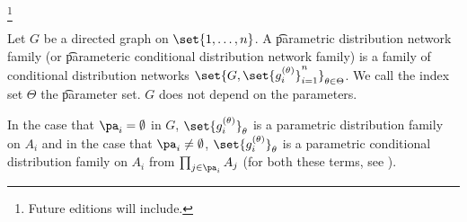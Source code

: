 
\footnote{Future editions will include.}


Let $G$ be a directed graph on $\set{1,\dots, n}$.
A \t{parametric distribution network family} (or \t{parameteric conditional distribution network family}) is a family of conditional distribution networks $\set{G, \set{g_i^{(\theta)}}_{i=1}^{n}}_{\theta \in \Theta}$.
We call the index set $\Theta$ the \t{parameter set}.
$G$ does not depend on the parameters.

In the case that $\pa_i = \emptyset$ in $G$, $\set{g_i^{(\theta)}}_\theta$ is a parametric distribution family on $A_i$ and in the case that $\pa_i \neq \emptyset$, $\set{g_i^{(\theta)}}_{\theta}$ is a parametric conditional distribution family on $A_i$ from $\prod_{j \in \pa_{i}} A_j$ (for both these terms, see ).

\blankpage
